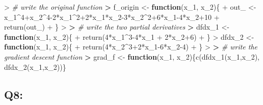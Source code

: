 \documentclass[
]{article}
\newenvironment{Shaded}{\begin{snugshade}}{\end{snugshade}}
\newcommand{\CommentTok}[1]{\textcolor[rgb]{0.56,0.35,0.01}{\textit{#1}}}
\newcommand{\ControlFlowTok}[1]{\textcolor[rgb]{0.13,0.29,0.53}{\textbf{#1}}}
\newcommand{\DecValTok}[1]{\textcolor[rgb]{0.00,0.00,0.81}{#1}}
\newcommand{\ErrorTok}[1]{\textcolor[rgb]{0.64,0.00,0.00}{\textbf{#1}}}
\newcommand{\FunctionTok}[1]{\textcolor[rgb]{0.00,0.00,0.00}{#1}}
\newcommand{\NormalTok}[1]{#1}
\newcommand{\OtherTok}[1]{\textcolor[rgb]{0.56,0.35,0.01}{#1}}
\newcommand{\SpecialCharTok}[1]{\textcolor[rgb]{0.00,0.00,0.00}{#1}}
\begin{document}
\begin{Shaded}
\begin{Highlighting}[]
\SpecialCharTok{\textgreater{}} \CommentTok{\# write the original function}
\ErrorTok{\textgreater{}}\NormalTok{ f\_origin }\OtherTok{\textless{}{-}} \ControlFlowTok{function}\NormalTok{(x\_1, x\_2)\{}
\SpecialCharTok{+}\NormalTok{   out\_ }\OtherTok{\textless{}{-}}\NormalTok{ x\_1}\SpecialCharTok{\^{}}\DecValTok{4}\SpecialCharTok{+}\NormalTok{x\_2}\SpecialCharTok{\^{}}\DecValTok{4{-}2}\SpecialCharTok{*}\NormalTok{x\_1}\SpecialCharTok{\^{}}\DecValTok{2}\SpecialCharTok{+}\DecValTok{2}\SpecialCharTok{*}\NormalTok{x\_1}\SpecialCharTok{*}\NormalTok{x\_2}\DecValTok{{-}3}\SpecialCharTok{*}\NormalTok{x\_2}\SpecialCharTok{\^{}}\DecValTok{2}\SpecialCharTok{+}\DecValTok{6}\SpecialCharTok{*}\NormalTok{x\_1}\DecValTok{{-}4}\SpecialCharTok{*}\NormalTok{x\_2}\SpecialCharTok{+}\DecValTok{10}
\SpecialCharTok{+}   \FunctionTok{return}\NormalTok{(out\_)}
\SpecialCharTok{+}\NormalTok{ \}}
\SpecialCharTok{\textgreater{}} 
\ErrorTok{\textgreater{}} \CommentTok{\# write the two partial derivatives}
\ErrorTok{\textgreater{}}\NormalTok{ dfdx\_1 }\OtherTok{\textless{}{-}} \ControlFlowTok{function}\NormalTok{(x\_1, x\_2)\{}
\SpecialCharTok{+}   \FunctionTok{return}\NormalTok{(}\DecValTok{4}\SpecialCharTok{*}\NormalTok{x\_1}\SpecialCharTok{\^{}}\DecValTok{3{-}4}\SpecialCharTok{*}\NormalTok{x\_1 }\SpecialCharTok{+} \DecValTok{2}\SpecialCharTok{*}\NormalTok{x\_2}\SpecialCharTok{+}\DecValTok{6}\NormalTok{)}
\SpecialCharTok{+}\NormalTok{ \}}
\SpecialCharTok{\textgreater{}}\NormalTok{ dfdx\_2 }\OtherTok{\textless{}{-}} \ControlFlowTok{function}\NormalTok{(x\_1, x\_2)\{}
\SpecialCharTok{+}   \FunctionTok{return}\NormalTok{(}\DecValTok{4}\SpecialCharTok{*}\NormalTok{x\_2}\SpecialCharTok{\^{}}\DecValTok{3}\SpecialCharTok{+}\DecValTok{2}\SpecialCharTok{*}\NormalTok{x\_1}\DecValTok{{-}6}\SpecialCharTok{*}\NormalTok{x\_2}\DecValTok{{-}4}\NormalTok{)}
\SpecialCharTok{+}\NormalTok{ \}}
\SpecialCharTok{\textgreater{}} 
\ErrorTok{\textgreater{}} \CommentTok{\# write the gradient descent function}
\ErrorTok{\textgreater{}}\NormalTok{ grad\_f }\OtherTok{\textless{}{-}} \ControlFlowTok{function}\NormalTok{(x\_1, x\_2)\{}\FunctionTok{c}\NormalTok{(}\FunctionTok{dfdx\_1}\NormalTok{(x\_1,x\_2), }\FunctionTok{dfdx\_2}\NormalTok{(x\_1,x\_2))\}}
\end{Highlighting}
\end{Shaded}

\hypertarget{q8}{%
\subsection{Q8:}\label{q8}}
\end{document}
